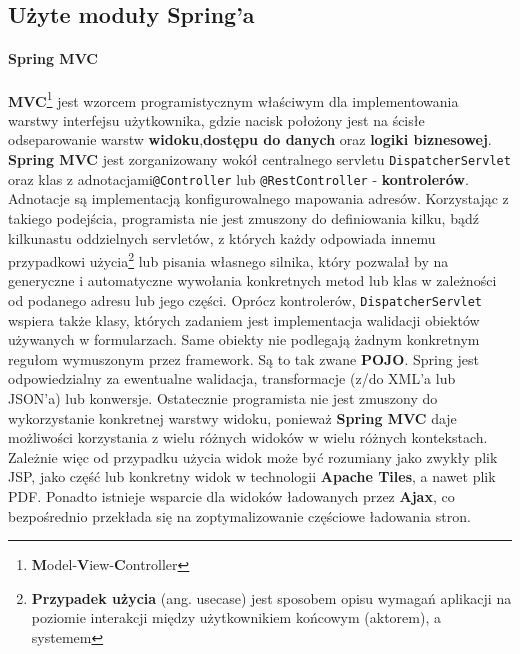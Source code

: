 	\subsection{Użyte moduły Spring'a}
		
	\paragraph{Spring MVC}\label{app:spring_mvc}
	\textbf{MVC}\footnote{\textbf{M}odel-\textbf{V}iew-\textbf{C}ontroller} jest wzorcem programistycznym właściwym dla implementowania warstwy interfejsu użytkownika, gdzie nacisk położony jest na ścisłe odseparowanie warstw \textbf{widoku},\textbf{dostępu do danych} oraz \textbf{logiki biznesowej}. \textbf{Spring MVC} jest zorganizowany wokół centralnego servletu \texttt{DispatcherServlet} oraz klas z adnotacjami\texttt{@Controller} lub \texttt{@RestController} - \textbf{kontrolerów}. Adnotacje są implementacją konfigurowalnego mapowania adresów. Korzystając z takiego podejścia, programista nie jest zmuszony do definiowania kilku, bądź kilkunastu oddzielnych servletów, z których każdy odpowiada innemu przypadkowi użycia\footnote{\textbf{Przypadek użycia} (ang. usecase) jest sposobem opisu wymagań aplikacji na poziomie interakcji między użytkownikiem końcowym (aktorem), a systemem} lub pisania własnego silnika, który pozwalał by na generyczne i automatyczne wywołania konkretnych metod lub klas w zależności od podanego adresu lub jego części. Oprócz kontrolerów, \texttt{DispatcherServlet} wspiera także klasy, których zadaniem jest implementacja walidacji obiektów używanych w formularzach. Same obiekty nie podlegają żadnym konkretnym regułom wymuszonym przez framework. Są to tak zwane \textbf{POJO}. Spring jest odpowiedzialny za ewentualne walidacja, transformacje (z/do XML'a lub JSON'a) lub konwersje. Ostatecznie programista nie jest zmuszony do wykorzystanie konkretnej warstwy widoku, ponieważ \textbf{Spring MVC} daje możliwości korzystania z wielu różnych widoków w wielu różnych kontekstach. Zależnie więc od przypadku użycia widok może być rozumiany jako zwykły plik JSP, jako część lub konkretny widok w technologii \textbf{Apache Tiles}, a nawet plik PDF. Ponadto istnieje wsparcie dla widoków ładowanych przez \textbf{Ajax}, co bezpośrednio przekłada się na zoptymalizowanie częściowe ładowania stron.

